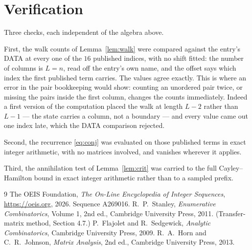 \documentclass[11pt,a4paper]{article}
\theoremstyle{plain}
\theoremstyle{definition}
\begin{document}
\section{Verification}

Three checks, each independent of the algebra above.

First, the walk counts of Lemma~\ref{lem:walk} were compared against the entry's DATA at
every one of the $16$ published indices, with no shift fitted: the number of columns is
$L=n$, read off the entry's own name, and the offset says which index the first
published term carries. The values agree exactly. This is where an error in the pair
bookkeeping would show: counting an unordered pair twice, or missing the pairs inside the
first column, changes the counts immediately. Indeed a first version of the computation
placed the walk at length $L-2$ rather than $L-1$ --- the state carries a column, not a
boundary --- and every value came out one index late, which the DATA comparison rejected.

Second, the recurrence \eqref{eq:conj} was evaluated on those published terms in exact
integer arithmetic, with no matrices involved, and vanishes wherever it applies.

Third, the annihilation test of Lemma~\ref{lem:crit} was carried to the full
Cayley--Hamilton bound in exact integer arithmetic rather than to a sampled prefix.

\begin{thebibliography}{9}
 The OEIS Foundation, \emph{The On-Line Encyclopedia of Integer
Sequences}, \url{https://oeis.org}, 2026. Sequence A269016.
 R.~P.~Stanley, \emph{Enumerative Combinatorics}, Volume 1, 2nd ed.,
Cambridge University Press, 2011. (Transfer-matrix method, Section 4.7.)
 P.~Flajolet and R.~Sedgewick, \emph{Analytic Combinatorics}, Cambridge
University Press, 2009.
 R.~A.~Horn and C.~R.~Johnson, \emph{Matrix Analysis}, 2nd ed., Cambridge
University Press, 2013.
\end{thebibliography}
\end{document}

